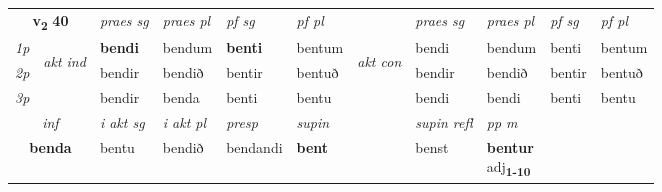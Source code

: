 \noindent
\begin{tabular}{lllllllllll} \toprule
\multicolumn{2}{c}{\textbf{v{\textsubscript{2}}} \Large{\textbf{40}}}  &  \textit{praes sg}  & \textit{praes pl}  &\textit{ pf sg} & \textit{pf pl} &  &  \textit{praes sg}  & \textit{praes pl}  & \textit{pf sg} & \textit{pf pl } \\*
	\cmidrule{3-6} \cmidrule{8-11}
 {\textit{1p}} & \multirow{3}{*}{\begin{turn}{90}\textit{akt ind}\end{turn}} & \textbf{bendi} & bendum & \textbf{benti} & bentum & \multirow{3}{*}{\begin{turn}{90}\textit{akt con}\end{turn}} &bendi & bendum & benti & bentum\\*
 {\textit{2p}} &  &  bendir  & bendið & bentir & bentuð & & bendir & bendið & bentir & bentuð \\*
{\textit{3p}} &  & bendir & benda & benti & bentu & & bendi & bendi& benti & bentu \\*
\cmidrule{3-6} \cmidrule{8-11}

   \multicolumn{2}{c}{\textit{inf}}  & \textit{i akt sg} & \textit{i akt pl}   & \textit{presp} & \textit{supin} && \textit{supin refl} & \textit{pp m} \\*
  \multicolumn{2}{c}{\textbf{benda}} & bentu  & bendið   & bendandi &  \textbf{bent} && benst & \specialcell{\textbf{bentur} \\ adj\textbf{\textsubscript{1-10}}} \\*
\end{tabular}

